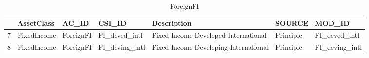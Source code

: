 \begin{longtable}{rllllll}
\caption{ForeignFI} \\ 
  \hline
 & AssetClass & AC\_ID & CSI\_ID & Description & SOURCE & MOD\_ID \\ 
  \hline
7 & FixedIncome & ForeignFI & FI\_deved\_intl & Fixed Income Developed International & Principle & FI\_deved\_intl \\ 
  8 & FixedIncome & ForeignFI & FI\_deving\_intl & Fixed Income Developing International & Principle & FI\_deving\_intl \\ 
   \hline
\hline
\end{longtable}
